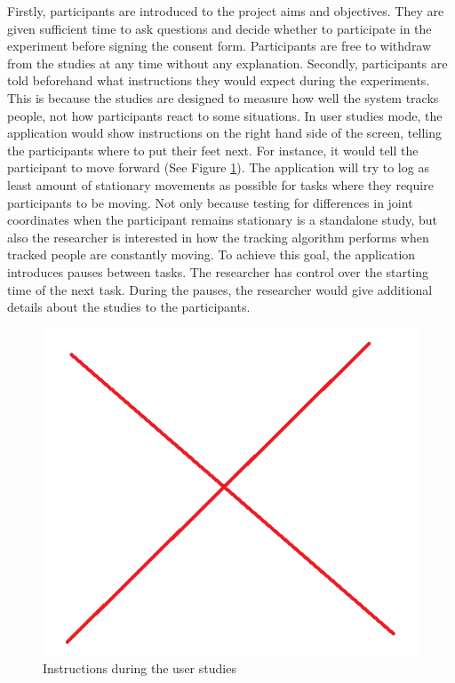 \documentclass{sigchi}
\begin{document}
Firstly, participants are introduced to the project aims and objectives. They are given sufficient time to ask questions and decide whether to participate in the experiment before signing the consent form. Participants are free to withdraw from the studies at any time without any explanation. Secondly, participants are told beforehand what instructions they would expect during the experiments. This is because the studies are designed to measure how well the system tracks people, not how participants react to some situations. In user studies mode, the application would show instructions on the right hand side of the screen, telling the participants where to put their feet next. For instance, it would tell the participant to move forward (See Figure \ref{fig:studies_instruction}). The application will try to log as least amount of stationary movements as possible for tasks where they require participants to be moving. Not only because testing for differences in joint coordinates when the participant remains stationary is a standalone study, but also the researcher is interested in how the tracking algorithm performs when tracked people are constantly moving. To achieve this goal, the application introduces pauses between tasks. The researcher has control over the starting time of the next task. During the pauses, the researcher would give additional details about the studies to the participants.

\begin{figure}[!h]
  \centering
  \includegraphics[width=0.9\columnwidth]{studies_instruction}
  \caption{Instructions during the user studies}
  \label{fig:studies_instruction}
\end{figure}
\end{document}
